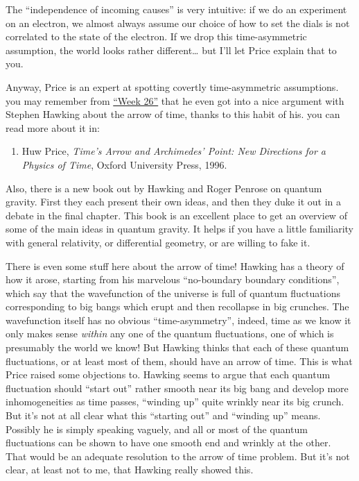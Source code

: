 \documentclass{article}
\def\tightlist{}
\begin{document}
The ``independence of incoming causes'' is very intuitive: if we do an
experiment on an electron, we almost always assume our choice of how to
set the dials is not correlated to the state of the electron. If we drop
this time-asymmetric assumption, the world looks rather
different\ldots{} but I'll let Price explain that to you.

Anyway, Price is an expert at spotting covertly time-asymmetric
assumptions. you may remember from \protect\hyperlink{week26}{``Week
26''} that he even got into a nice argument with Stephen Hawking about
the arrow of time, thanks to this habit of his. you can read more about
it in:

\begin{enumerate}
\def\labelenumi{\arabic{enumi})}
\tightlist
\item
  Huw Price, \emph{Time's Arrow and Archimedes' Point: New Directions
  for a Physics of Time}, Oxford University Press, 1996.
\end{enumerate}

Also, there is a new book out by Hawking and Roger Penrose on quantum
gravity. First they each present their own ideas, and then they duke it
out in a debate in the final chapter. This book is an excellent place to
get an overview of some of the main ideas in quantum gravity. It helps
if you have a little familiarity with general relativity, or
differential geometry, or are willing to fake it.

There is even some stuff here about the arrow of time! Hawking has a
theory of how it arose, starting from his marvelous ``no-boundary
boundary conditions'', which say that the wavefunction of the universe
is full of quantum fluctuations corresponding to big bangs which erupt
and then recollapse in big crunches. The wavefunction itself has no
obvious ``time-asymmetry'', indeed, time as we know it only makes sense
\emph{within} any one of the quantum fluctuations, one of which is
presumably the world we know! But Hawking thinks that each of these
quantum fluctuations, or at least most of them, should have an arrow of
time. This is what Price raised some objections to. Hawking seems to
argue that each quantum fluctuation should ``start out'' rather smooth
near its big bang and develop more inhomogeneities as time passes,
``winding up'' quite wrinkly near its big crunch. But it's not at all
clear what this ``starting out'' and ``winding up'' means. Possibly he
is simply speaking vaguely, and all or most of the quantum fluctuations
can be shown to have one smooth end and wrinkly at the other. That would
be an adequate resolution to the arrow of time problem. But it's not
clear, at least not to me, that Hawking really showed this.
\end{document}

